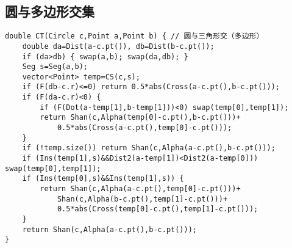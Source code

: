 \documentclass[landscape,a4paper]{article}
\begin{document}
\subsection{圆与多边形交集}
\begin{lstlisting}
double CT(Circle c,Point a,Point b) { // 圆与三角形交（多边形）
	double da=Dist(a-c.pt()), db=Dist(b-c.pt());
	if (da>db) { swap(a,b); swap(da,db); }
	Seg s=Seg(a,b);
	vector<Point> temp=CS(c,s);
	if (F(db-c.r)<=0) return 0.5*abs(Cross(a-c.pt(),b-c.pt()));
	if (F(da-c.r)<0) {
		if (F(Dot(a-temp[1],b-temp[1]))<0) swap(temp[0],temp[1]);
		return Shan(c,Alpha(temp[0]-c.pt(),b-c.pt()))+
			0.5*abs(Cross(a-c.pt(),temp[0]-c.pt()));
	}
	if (!temp.size()) return Shan(c,Alpha(a-c.pt(),b-c.pt()));
	if (Ins(temp[1],s)&&Dist2(a-temp[1])<Dist2(a-temp[0])) swap(temp[0],temp[1]);
	if (Ins(temp[0],s)&&Ins(temp[1],s)) {
		return Shan(c,Alpha(a-c.pt(),temp[0]-c.pt()))+
			Shan(c,Alpha(b-c.pt(),temp[1]-c.pt()))+
			0.5*abs(Cross(temp[0]-c.pt(),temp[1]-c.pt()));
	}
	return Shan(c,Alpha(a-c.pt(),b-c.pt()));
}
\end{lstlisting}
\end{document}
